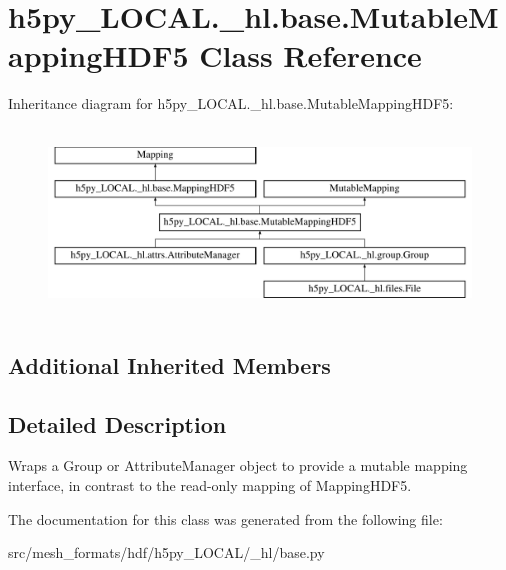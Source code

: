 \hypertarget{classh5py__LOCAL_1_1__hl_1_1base_1_1MutableMappingHDF5}{}\section{h5py\+\_\+\+L\+O\+C\+A\+L.\+\_\+hl.\+base.\+Mutable\+Mapping\+H\+D\+F5 Class Reference}
\label{classh5py__LOCAL_1_1__hl_1_1base_1_1MutableMappingHDF5}
Inheritance diagram for h5py\+\_\+\+L\+O\+C\+A\+L.\+\_\+hl.\+base.\+Mutable\+Mapping\+H\+D\+F5\+:\begin{figure}[H]
\begin{center}
\leavevmode
\includegraphics[height=5.000000cm]{classh5py__LOCAL_1_1__hl_1_1base_1_1MutableMappingHDF5}
\end{center}
\end{figure}
\subsection*{Additional Inherited Members}


\subsection{Detailed Description}
\begin{DoxyVerb}    Wraps a Group or AttributeManager object to provide a mutable
    mapping interface, in contrast to the read-only mapping of
    MappingHDF5.
\end{DoxyVerb}
 

The documentation for this class was generated from the following file\+:\begin{DoxyCompactItemize}
\item 
src/mesh\+\_\+formats/hdf/h5py\+\_\+\+L\+O\+C\+A\+L/\+\_\+hl/base.\+py\end{DoxyCompactItemize}
